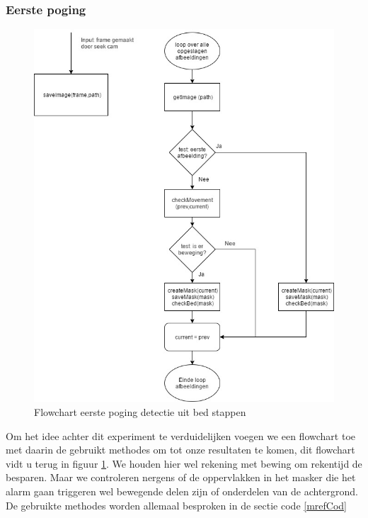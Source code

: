 \subsubsection{Eerste poging}
\label{ERefDUBEP}
\begin{figure}[h]
	\includegraphics[scale=0.45]{FlowChart_DetectUitBed_EerstePoging}
	\caption{Flowchart eerste poging detectie uit bed stappen}
	\label{imgFCDUBEP}
\end{figure}
Om het idee achter dit experiment te verduidelijken voegen we een flowchart toe met daarin de gebruikt methodes om tot onze resultaten te komen, dit flowchart vidt u terug in figuur \ref{imgFCDUBEP}. We houden hier wel rekening met bewing om rekentijd de besparen. Maar we controleren nergens of de oppervlakken in het masker die het alarm gaan triggeren wel bewegende delen zijn of onderdelen van de achtergrond. De gebruikte methodes worden allemaal besproken in de sectie code \ref{mrefCod}


